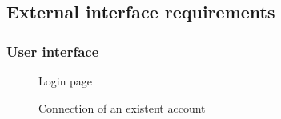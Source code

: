 \subsection{External interface requirements}
\subsubsection{User interface}

\begin{figure}[!h]
	\centering
	\begin{minipage}[b]{0.65\textwidth}
		\caption{Login page}
	\end{minipage}
	\begin{minipage}[b]{0.65\textwidth}
		\caption{Connection of an existent account}
	\end{minipage}
\end{figure}
